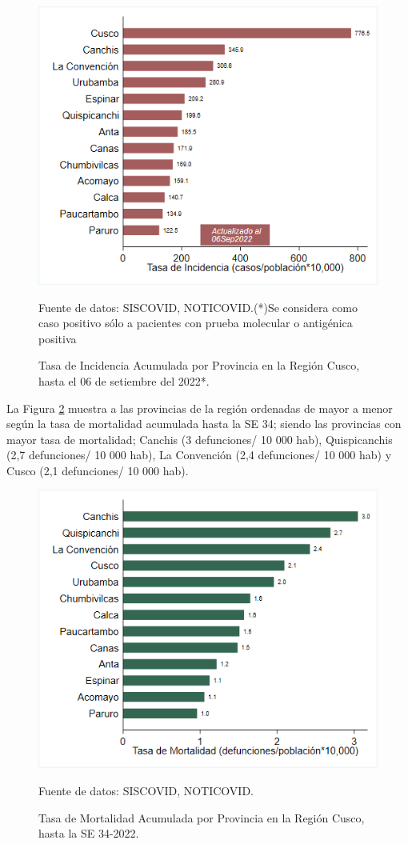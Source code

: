 \documentclass[12pt,a4paper,openany]{book}
\begin{document}
	\begin{figure}[!htpb]
		\caption{Tasa de Incidencia Acumulada por Provincia en la Región Cusco, hasta el 06 de setiembre del 2022*. }\label{fig:incidencia_provincias}
		\begin{center}
			\includegraphics[width=0.60\linewidth]{../figuras/incidencia_provincial_2022.png}
		\end{center}
		{\footnotesize {
				Fuente de datos: SISCOVID, NOTICOVID.(*)Se considera como caso positivo sólo a pacientes con prueba molecular o antigénica positiva}}
	\end{figure}
	
	La Figura \ref{fig:mortalidad_ordenada} muestra a las provincias de la región ordenadas de mayor a menor según la tasa de mortalidad acumulada hasta la SE 34; siendo las provincias con mayor tasa de mortalidad;  Canchis (3 defunciones/ 10 000 hab), Quispicanchis (2,7 defunciones/ 10 000 hab), La Convención (2,4 defunciones/ 10 000 hab) y Cusco (2,1 defunciones/ 10 000 hab).
	
	\begin{figure}[h]
		\caption{Tasa de Mortalidad Acumulada por Provincia en la Región Cusco, hasta la SE 34-2022. }\label{fig:mortalidad_ordenada}
		\begin{center}
			\includegraphics[width=0.60\linewidth]{../figuras/mortalidad_provincial_2022.png}
		\end{center}
		{\footnotesize {Fuente de datos: SISCOVID, NOTICOVID.}}
	\end{figure}
	
\end{document}
